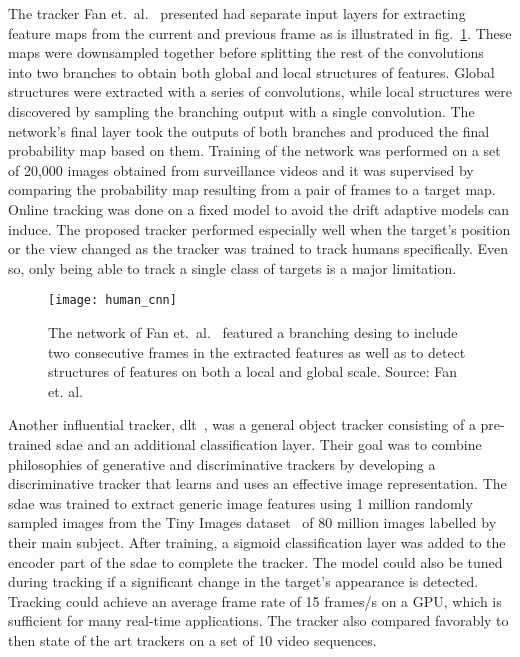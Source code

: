 The tracker Fan et.~al.~\cite{HUMAN_CNN} presented had separate input layers for extracting feature maps from the current and previous frame as is illustrated in fig.~\ref{fig:human_cnn}. These maps were downsampled together before splitting the rest of the convolutions into two branches to obtain both global and local structures of features. Global structures were extracted with a series of convolutions, while local structures were discovered by sampling the branching output with a single convolution. The network's final layer took the outputs of both branches and produced the final probability map based on them. Training of the network was performed on a set of 20,000 images obtained from surveillance videos and it was supervised by comparing the probability map resulting from a pair of frames to a target map. Online tracking was done on a fixed model to avoid the drift adaptive models can induce. The proposed tracker performed especially well when the target's position or the view changed as the tracker was trained to track humans specifically. Even so, only being able to track a single class of targets is a major limitation.~\cite{HUMAN_CNN}

\begin{figure}[H]
\centering
\texttt{[image: human\_cnn]}
\caption{The network of Fan et.~al.~\cite{HUMAN_CNN} featured a branching desing to include two consecutive frames in the extracted features as well as to detect structures of features on both a local and global scale. Source: Fan et. al.~\cite{HUMAN_CNN}}\label{fig:human_cnn}
\end{figure}

Another influential tracker, \ac{dlt}~\cite{DLT}, was a general object tracker consisting of a pre-trained \ac{sdae} and an additional classification layer. Their goal was to combine philosophies of generative and discriminative trackers by developing a discriminative tracker that learns and uses an effective image representation. The \ac{sdae} was trained to extract generic image features using 1 million randomly sampled images from the Tiny Images dataset~\cite{TINY_IMAGES} of 80 million images labelled by their main subject. After training, a sigmoid classification layer was added to the encoder part of the \ac{sdae} to complete the tracker. The model could also be tuned during tracking if a significant change in the target's appearance is detected. Tracking could achieve an average frame rate of 15 frames/s on a GPU, which is sufficient for many real-time applications. The tracker also compared favorably to then state of the art trackers on a set of 10 video sequences.~\cite{DLT}


